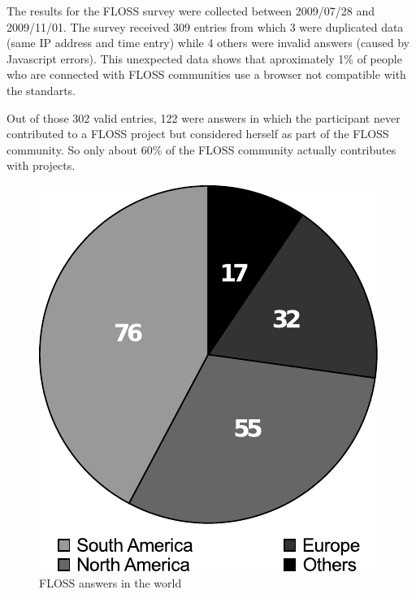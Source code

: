\documentclass[lnbip]{svmultln}
\begin{document}
The results for the FLOSS survey were collected between 2009/07/28 and
2009/11/01. The survey received 309 entries from which 3 were
duplicated data (same IP address and time entry) while 4 others were
invalid answers (caused by Javascript errors). This unexpected data
shows that aproximately 1\% of people who are connected with FLOSS
communities use a browser not compatible with the standarts.

Out of those 302 valid entries, 122 were answers in which the
participant never contributed to a FLOSS project but considered
herself as part of the FLOSS community. So only about 60\% of the
FLOSS community actually contributes with projects.

\begin{figure}[htb]
  \begin{minipage}[t]{0.5\linewidth}
    \includegraphics[scale=0.8]{floss-world.pdf}
    \caption{FLOSS answers in the world}
    \label{fig:floss-world}
  \end{minipage}
  \begin{minipage}[t]{0.5\linewidth}

\end{minipage}
\end{figure}
\end{document}

